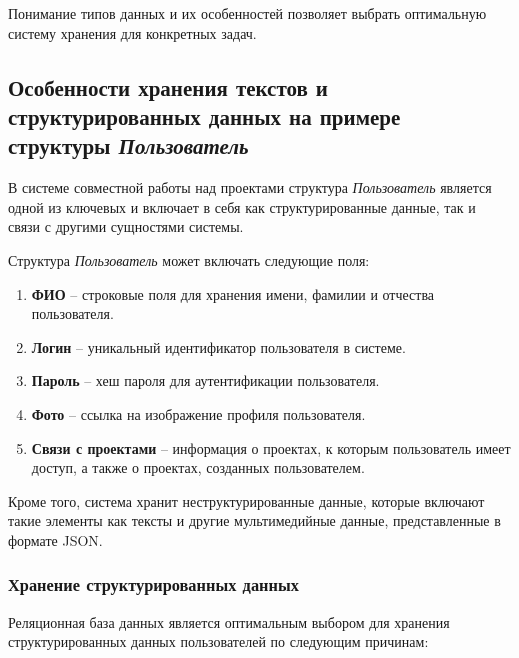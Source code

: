Понимание типов данных и их особенностей позволяет выбрать оптимальную систему хранения для конкретных задач.

\subsection{Особенности хранения текстов и структурированных данных на примере \\ структуры \textit{Пользователь}}

В системе совместной работы над проектами структура \textit{Пользователь} является одной из ключевых и включает в себя как структурированные данные, так и связи с другими сущностями системы.

Структура \textit{Пользователь} может включать следующие поля:

\begin{enumerate}[wide=12.6mm, leftmargin=12.6mm]
    \item \textbf{ФИО} -- строковые поля для хранения имени, фамилии и отчества пользователя.
    \item \textbf{Логин} -- уникальный идентификатор пользователя в системе.
    \item \textbf{Пароль} -- хеш пароля для аутентификации пользователя.
    \item \textbf{Фото} -- ссылка на изображение профиля пользователя.
    \item \textbf{Связи с проектами} -- информация о проектах, к которым пользователь имеет доступ, а также о проектах, созданных пользователем.
\end{enumerate}

Кроме того, система хранит неструктурированные данные, которые включают такие элементы как тексты и другие мультимедийные данные, представленные в формате JSON.

\subsubsection{Хранение структурированных данных}

Реляционная база данных является оптимальным выбором для хранения структурированных данных пользователей по следующим причинам:

